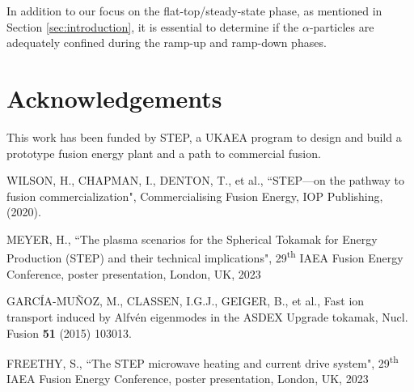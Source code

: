 \documentclass[10pt, a4paper, twoside]{article}
\begin{document}
In addition to our focus on the flat-top/steady-state phase, as mentioned in Section \ref{sec:introduction}, it is essential to determine if the $\alpha$-particles are adequately confined during the ramp-up and ramp-down phases.

\section*{Acknowledgements}

This work has been funded by STEP, a UKAEA program to design and build a prototype fusion energy plant and a path to commercial fusion.

\fontsize{9}{12}\selectfont
\setlength{\parskip}{0pt}
\begin{thebibliography}{9}

    WILSON, H., CHAPMAN, I., DENTON, T., et al., 
    ``STEP---on the pathway to fusion commercialization", 
    Commercialising Fusion Energy, 
    IOP Publishing, 
    (2020).

    MEYER, H.,
    ``The plasma scenarios for the Spherical Tokamak for Energy Production (STEP) and their technical implications",
    29\textsuperscript{th} IAEA Fusion Energy Conference,
    poster presentation, 
    London, UK, 
    2023

    GARC\'IA-MU\~NOZ, M., CLASSEN, I.G.J., GEIGER, B., et al., 
    Fast ion transport induced by Alfv\'en eigenmodes in the ASDEX Upgrade tokamak, 
    Nucl. Fusion 
    \textbf{51} 
    (2015) 
    103013.

    FREETHY, S.,
    ``The STEP microwave heating and current drive system",
    29\textsuperscript{th} IAEA Fusion Energy Conference,
    poster presentation, 
    London, UK, 
    2023


\end{thebibliography}
\end{document}
